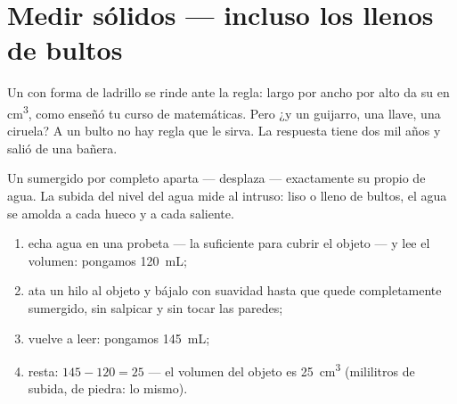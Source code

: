 \section{Medir sólidos --- incluso los llenos de bultos}

Un  con forma de ladrillo se rinde ante la regla: largo por
ancho por alto da su  en \unit{cm^3}, como enseñó tu curso de
matemáticas. Pero ¿y un guijarro, una llave, una ciruela? A un bulto
no hay regla que le sirva. La respuesta tiene dos mil años y salió de
una bañera.

\begin{proposition}[El desplazamiento]\label{prop:g6:mass-and-volume:displacement}
Un  sumergido por completo aparta --- desplaza ---
exactamente su propio  de agua. La subida del nivel del agua
mide al intruso: liso o lleno de bultos, el agua se amolda a cada
hueco y a cada saliente.
\end{proposition}

\begin{method}\label{met:g6:mass-and-volume:rise}
\begin{enumerate}
  \item echa agua en una probeta --- la suficiente para cubrir el
        objeto --- y lee el volumen: pongamos \qty{120}{mL};
  \item ata un hilo al objeto y bájalo con suavidad hasta que quede
        completamente sumergido, sin salpicar y sin tocar las
        paredes;
  \item vuelve a leer: pongamos \qty{145}{mL};
  \item resta: $145 - 120 = 25$ --- el volumen del objeto es
        \qty{25}{cm^3} (mililitros de subida,  de
        piedra: lo mismo).
\end{enumerate}
\end{method}

